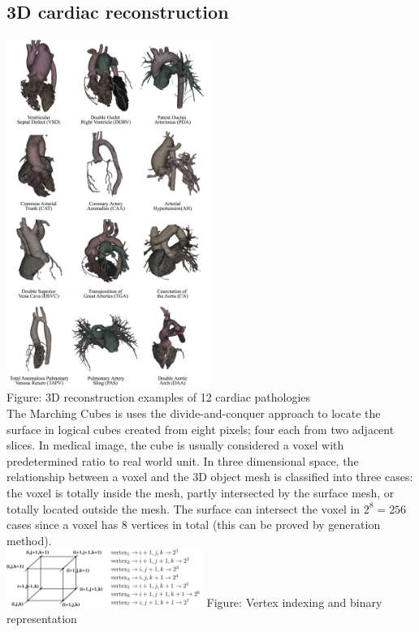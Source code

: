 \documentclass{article}
\begin{document}
\begin{multicols}{2}
\subsection{3D cardiac reconstruction}
\includegraphics[width=0.5\textwidth]{figures/3d DIS.png} \\
Figure: 3D reconstruction examples of 12 cardiac pathologies \\

The Marching Cubes is uses the divide-and-conquer approach to locate the surface in logical cubes created from eight pixels; four each from two adjacent slices. In medical image, the cube is usually considered a voxel with predetermined ratio to real world unit. In three dimensional space, the relationship between a voxel and the 3D object mesh is classified into three cases: the voxel is totally inside the mesh, partly intersected by the surface mesh, or totally located outside the mesh. The surface can intersect the voxel in $2^8=256$ cases since a voxel has $8$ vertices in total (this can be proved by generation method). \\


\includegraphics[width=0.48\textwidth]{figures/Binary Vertices.png}
Figure: Vertex indexing and binary representation \\


\end{multicols}
\end{document}
